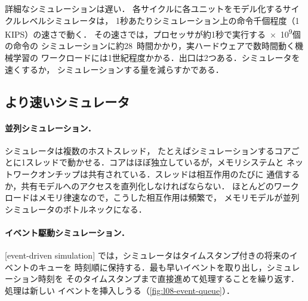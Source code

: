 \documentclass[../main.tex]{subfiles}
\begin{document}
詳細なシミュレーションは遅い．
各サイクルに各ユニットをモデル化するサイクルレベルシミュレータは，
1秒あたりシミュレーション上の命令千個程度（\num{1} KIPS）の速さで動く．
その速さでは，プロセッサが約1秒で実行する\num{e9}個の命令の
シミュレーションに約28~時間かかり，実ハードウェアで数時間動く機械学習の
ワークロードには1世紀程度かかる．出口は2つある．シミュレータを速くするか，
シミュレーションする量を減らすかである．

\subsection{より速いシミュレータ}

\paragraph{並列シミュレーション．}  シミュレータは複数のホストスレッド，
たとえばシミュレーションするコアごとに1スレッドで動かせる．コアはほぼ独立しているが，メモリシステムと
ネットワークオンチップは共有されている．スレッドは相互作用のたびに
通信するか，共有モデルへのアクセスを直列化しなければならない．
ほとんどのワークロードはメモリ律速なので，こうした相互作用は頻繁で，
メモリモデルが並列シミュレータのボトルネックになる．

\paragraph{イベント駆動シミュレーション．}

\begin{definition}[イベント駆動シミュレーション]
  \label{def:l08-event-driven}
  [event-driven simulation]
  では，シミュレータはタイムスタンプ付きの将来のイベントのキューを
  時刻順に保持する．最も早いイベントを取り出し，シミュレーション時刻を
  そのタイムスタンプまで直接進めて処理することを繰り返す．処理は新しい
  イベントを挿入しうる（\cref{fig:l08-event-queue}）．
\end{definition}
\end{document}

